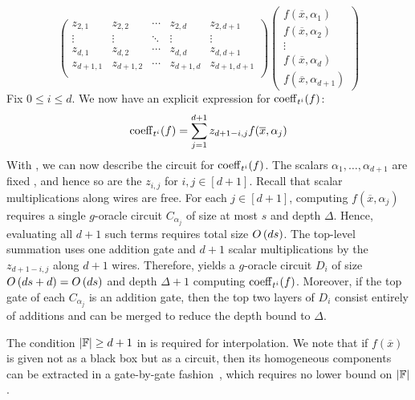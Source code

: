 \documentclass[letterpaper, 11pt]{amsart}
\begin{document}
\begin{pf}
\[\begin{pmatrix}
      z_{2, 1} & z_{2, 2} & \cdots & z_{2, d} & z_{2, d + 1} \\
      \vdots & \vdots & \ddots & \vdots & \vdots \\
      z_{d, 1} & z_{d, 2} & \cdots & z_{d, d} & z_{d, d + 1} \\
      z_{d + 1, 1} & z_{d + 1, 2} & \cdots & z_{d + 1, d} & z_{d + 1, d + 1} \\
    \end{pmatrix}
    \begin{pmatrix}
      f(\overline{x},\alpha_1) \\
      f(\overline{x},\alpha_2) \\
      \vdots \\
      f(\overline{x},\alpha_d) \\
      f(\overline{x},\alpha_{d+1})
    \end{pmatrix}
  \]
  Fix $0 \leq i \leq d$.
  We now have an explicit expression for $\operatorname{coeff}_{t^i}(f)$:
  \begin{equation}\label{eq:H_i_explicit}
    \operatorname{coeff}_{t^i}(f) = \sum_{j = 1}^{d + 1} z_{d + 1 - i, j} f(\overline{x},\alpha_j)
  \end{equation}
  With , we can now describe the circuit for $\operatorname{coeff}_{t^i}(f)$.
  The scalars $\alpha_1, \ldots, \alpha_{d+1}$ are fixed \apriori, and hence so are the $z_{i,j}$ for $i, j \in [d + 1]$.
  Recall that scalar multiplications along wires are free.
  For each $j \in [d + 1]$, computing $f(\overline{x},\alpha_j)$ requires a single $g$-oracle circuit $C_{\alpha_j}$ of size at most $s$ and depth $\Delta$.
  Hence, evaluating all $d+1$ such terms requires total size $O\kern-0.0pt\left(ds\right)$.
  The top-level summation uses one addition gate and $d+1$ scalar multiplications by the $z_{d + 1 - i, j}$ along $d+1$ wires.
  Therefore,  yields a $g$-oracle circuit $D_i$ of size $O\kern-0.0pt\left(ds+d\right) = O\kern-0.0pt\left(ds\right)$ and depth $\Delta+1$ computing $\operatorname{coeff}_{t^i}(f)$.
  Moreover, if the top gate of each $C_{\alpha_j}$ is an addition gate, then the top two layers of $D_i$ consist entirely of additions and can be merged to reduce the depth bound to $\Delta$.
\end{pf}

\begin{rmk}
  The condition $\abs{\mathbb{F}} \geq d + 1$ in  is required for interpolation.
  We note that if $f(\overline{x})$ is given not as a black box but as a circuit, then its homogeneous components can be extracted in a gate-by-gate fashion~\cite{Str73}, which requires no lower bound on $\abs{\mathbb{F}}$.
\end{rmk}
\fi
\end{document}
